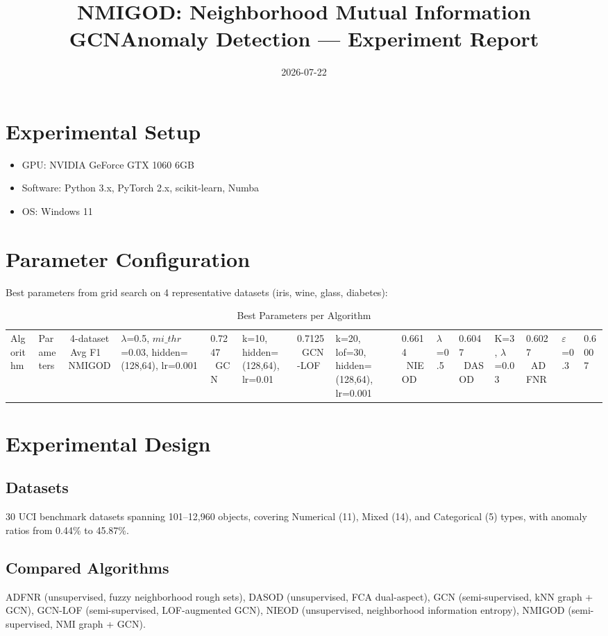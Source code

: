 \documentclass[11pt,a4paper]{article}
\title{\textbf{NMIGOD: Neighborhood Mutual Information GCN\for Anomaly Detection — Experiment Report}}
\author{}
\date{2026-07-22}
\begin{document}
\maketitle

\section{Experimental Setup}
\begin{itemize}
    \item GPU: NVIDIA GeForce GTX 1060 6GB
    \item Software: Python 3.x, PyTorch 2.x, scikit-learn, Numba
    \item OS: Windows 11
\end{itemize}

\section{Parameter Configuration}

Best parameters from grid search on 4 representative datasets (iris, wine, glass, diabetes):

\begin{table}[H]
\centering
\caption{Best Parameters per Algorithm}
\begin{tabular}{llc}
\toprule
Algorithm & Parameters & 4-dataset Avg F1 \
\midrule
NMIGOD & $\lambda$=0.5, $mi\_thr$=0.03, hidden=(128,64), lr=0.001 & 0.7247 \
GCN & k=10, hidden=(128,64), lr=0.01 & 0.7125 \
GCN-LOF & k=20, lof=30, hidden=(128,64), lr=0.001 & 0.6614 \
NIEOD & $\lambda$=0.5 & 0.6047 \
DASOD & K=3, $\lambda$=0.03 & 0.6027 \
ADFNR & $\varepsilon$=0.3 & 0.6007 \
\bottomrule
\end{tabular}
\end{table}

\section{Experimental Design}

\subsection{Datasets}
30 UCI benchmark datasets spanning 101--12,960 objects, covering Numerical (11), Mixed (14), and Categorical (5) types, with anomaly ratios from 0.44\% to 45.87\%.

\subsection{Compared Algorithms}
ADFNR (unsupervised, fuzzy neighborhood rough sets), DASOD (unsupervised, FCA dual-aspect), GCN (semi-supervised, kNN graph + GCN), GCN-LOF (semi-supervised, LOF-augmented GCN), NIEOD (unsupervised, neighborhood information entropy), NMIGOD (semi-supervised, NMI graph + GCN).
\end{document}
